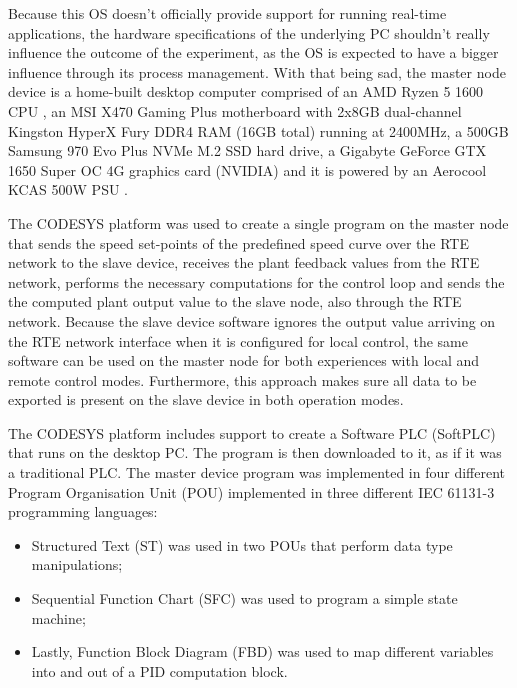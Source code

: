 Because this OS doesn't officially provide support for running real-time applications, the hardware specifications of the underlying PC shouldn't really influence the outcome of the experiment, as the OS is expected to have a bigger influence through its process management.
With that being sad, the master node device is a home-built desktop computer comprised of an AMD Ryzen\texttrademark{} 5 1600 CPU \cite{hdw:ryzen5-1600}, an MSI X470 Gaming Plus \cite{hdw:msi-x470} motherboard with 2x8GB dual-channel Kingston HyperX Fury DDR4 RAM (16GB total) \cite{hdw:hyperx-fury-8gb-ddr4-2400} running at 2400MHz, a 500GB Samsung 970 Evo Plus NVMe\textregistered{} M.2 SSD \cite{hdw:970evo-plus-ssd} hard drive, a Gigabyte GeForce\textregistered{} GTX 1650 Super\texttrademark{} OC 4G \cite{hdw:gigabyte-1650-super-oc} graphics card (NVIDIA) and it is powered by an Aerocool KCAS 500W PSU \cite{hdw:kcas-500w}.

The CODESYS platform was used to create a single program on the master node that sends the speed set-points of the predefined speed curve over the RTE network to the slave device, receives the plant feedback values from the RTE network, performs the necessary computations for the control loop and sends the the computed plant output value to the slave node, also through the RTE network.
Because the slave device software ignores the output value arriving on the RTE network interface when it is configured for local control, the same software can be used on the master node for both experiences with local and remote control modes.
Furthermore, this approach makes sure all data to be exported is present on the slave device in both operation modes.

The CODESYS platform includes support to create a Software PLC (SoftPLC) that runs on the desktop PC.
The program is then downloaded to it, as if it was a traditional PLC.
The master device program was implemented in four different Program Organisation Unit (POU) implemented in three different IEC 61131-3 programming languages: 
\begin{itemize}
	\item Structured Text (ST) was used in two POUs that perform data type manipulations;
	\item Sequential Function Chart (SFC) was used to program a simple state machine;
	\item Lastly, Function Block Diagram (FBD) was used to map different variables into and out of a PID computation block.
\end{itemize}


